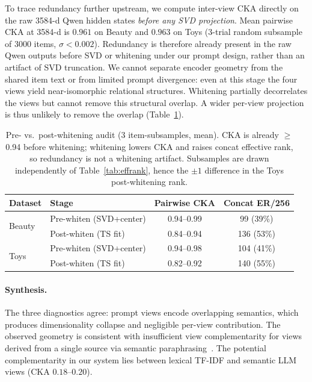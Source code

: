 \documentclass[sigconf,natbib=true,anonymous]{acmart}
\newcommand{\tfidf}{\textsc{TF-IDF}\xspace}
\newcommand{\llm}{\textsc{LLM}\xspace}
\begin{document}
To trace redundancy further upstream, we compute inter-view CKA directly on the raw 3584-d Qwen hidden states \emph{before any SVD projection}.
Mean pairwise CKA at 3584-d is $0.961$ on Beauty and $0.963$ on Toys (3-trial random subsample of 3000 items, $\sigma < 0.002$).
Redundancy is therefore already present in the raw Qwen outputs before SVD or whitening under our prompt design, rather than an artifact of SVD truncation.
We cannot separate encoder geometry from the shared item text or from limited prompt divergence: even at this stage the four views yield near-isomorphic relational structures.
Whitening partially decorrelates the views but cannot remove this structural overlap.
A wider per-view projection is thus unlikely to remove the overlap (Table~\ref{tab:cka-prepost}).

\begin{table}[t]
\centering
\caption{%
Pre- vs.\ post-whitening audit (3 item-subsamples, mean).
CKA is already $\ge$0.94 before whitening; whitening lowers CKA and raises concat effective rank, so redundancy is not a whitening artifact.
Subsamples are drawn independently of Table~\ref{tab:effrank}, hence the $\pm 1$ difference in the Toys post-whitening rank.%
}
\label{tab:cka-prepost}
\small
\begin{tabular}{@{}llcc@{}}
\toprule
Dataset & Stage & Pairwise CKA & Concat ER/256 \\
\midrule
\multirow{2}{*}{Beauty}
 & Pre-whiten (SVD+center)  & 0.94--0.99 & 99 (39\%) \\
 & Post-whiten (TS fit)     & 0.84--0.94 & 136 (53\%) \\
\midrule
\multirow{2}{*}{Toys}
 & Pre-whiten (SVD+center)  & 0.94--0.98 & 104 (41\%) \\
 & Post-whiten (TS fit)     & 0.82--0.92 & 140 (55\%) \\
\bottomrule
\end{tabular}
\end{table}

\paragraph{Synthesis.}
The three diagnostics agree: prompt views encode overlapping semantics, which produces dimensionality collapse and negligible per-view contribution.
The observed geometry is consistent with insufficient view complementarity for views derived from a single source via semantic paraphrasing~\cite{xu2013multiview}.
The potential complementarity in our system lies between lexical \tfidf and semantic \llm views (CKA $0.18$--$0.20$).
\end{document}
